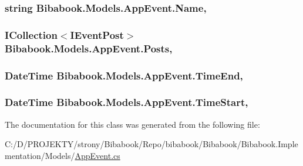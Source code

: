 \subsubsection[{Name}]{\setlength{\rightskip}{0pt plus 5cm}string Bibabook.\+Models.\+App\+Event.\+Name\hspace{0.3cm}{\ttfamily [get]}, {\ttfamily [set]}}\label{class_bibabook_1_1_models_1_1_app_event_ae0581126283337c793d4397afd74dc05}
\hypertarget{class_bibabook_1_1_models_1_1_app_event_a59ef083c6f4f43c0f589cb248eea0b67}{}
\subsubsection[{Posts}]{\setlength{\rightskip}{0pt plus 5cm}I\+Collection$<${\bf I\+Event\+Post}$>$ Bibabook.\+Models.\+App\+Event.\+Posts\hspace{0.3cm}{\ttfamily [get]}, {\ttfamily [set]}}\label{class_bibabook_1_1_models_1_1_app_event_a59ef083c6f4f43c0f589cb248eea0b67}
\hypertarget{class_bibabook_1_1_models_1_1_app_event_a121f344bd075a3a6c50b18d85743e73a}{}
\subsubsection[{Time\+End}]{\setlength{\rightskip}{0pt plus 5cm}Date\+Time Bibabook.\+Models.\+App\+Event.\+Time\+End\hspace{0.3cm}{\ttfamily [get]}, {\ttfamily [set]}}\label{class_bibabook_1_1_models_1_1_app_event_a121f344bd075a3a6c50b18d85743e73a}
\hypertarget{class_bibabook_1_1_models_1_1_app_event_aaaa7d9529bde8734f6aaece0f8d6d0a4}{}
\subsubsection[{Time\+Start}]{\setlength{\rightskip}{0pt plus 5cm}Date\+Time Bibabook.\+Models.\+App\+Event.\+Time\+Start\hspace{0.3cm}{\ttfamily [get]}, {\ttfamily [set]}}\label{class_bibabook_1_1_models_1_1_app_event_aaaa7d9529bde8734f6aaece0f8d6d0a4}


The documentation for this class was generated from the following file\+:\begin{DoxyCompactItemize}
\item 
C\+:/\+D/\+P\+R\+O\+J\+E\+K\+T\+Y/strony/\+Bibabook/\+Repo/bibabook/\+Bibabook/\+Bibabook.\+Implementation/\+Models/\hyperlink{_app_event_8cs}{App\+Event.\+cs}\end{DoxyCompactItemize}
